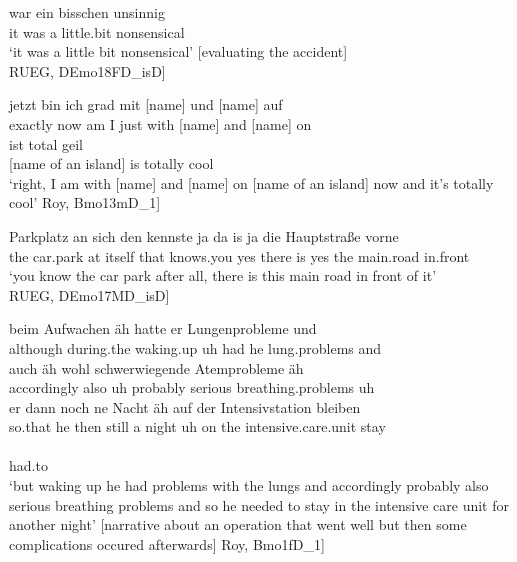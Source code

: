 \documentclass[output=paper,colorlinks,citecolor=brown]{langscibook}
\begin{document}
\ea\label{ex:ch1:ex27}

 {war} {ein} {bisschen} {unsinnig}  \\
it was a little.bit nonsensical \\
\trans ‘it was a little bit nonsensical’ [evaluating the accident] \\ \hspace{\fill}{[}RUEG, DEmo18FD\_isD{]}
\z

\ea\label{ex:ch1:ex28}
 {jetzt} {bin} {ich} {grad} {mit} {[name]} {und} {[name]} {auf}  \\
exactly now am I just with [name] and [name] on  \\
\sn {} {ist} {total} {geil} \\
{[name of an island]} is totally cool \\
\trans ‘right, I am with [name] and [name] on [name of an island] now and it’s totally cool’  \hspace{\fill}{[}Roy, Bmo13mD\_1{]}
\z

\ea\label{ex:ch1:ex29}
 {Parkplatz} {an} {sich} {den} {kennste} {ja} {da} {is} {ja} {die} {Hauptstraße} {vorne} \\
the car.park at itself that knows.you yes there is yes the main.road in.front \\
\trans ‘you know the car park after all, there is this main road in front of it’ \\ \hspace{\fill}{[}RUEG, DEmo17MD\_isD{]}
\z

\ea\label{ex:ch1:ex30}
 {beim} {Aufwachen} {äh} {hatte} {er} {Lungenprobleme} {und}  \\
although during.the waking.up uh had he lung.problems and  \\
\sn {} {auch} {äh} {wohl} {schwerwiegende} {Atemprobleme} {äh}  \\
accordingly also uh probably serious breathing.problems uh  \\
\sn {} {er} {dann} {noch} {ne} {Nacht} {äh} {auf} {der} {Intensivstation} {bleiben}   \\
so.that he then still a night uh on the intensive.care.unit stay  \\
\sn {}\\
had.to \\
\trans ‘but waking up he had problems with the lungs and accordingly probably also serious breathing problems and so he needed to stay in the intensive care unit for another night' [narrative about an operation that went well but then some complications occured afterwards] \hspace{\fill}{[}Roy, Bmo1fD\_1{]}
\z
\end{document}
